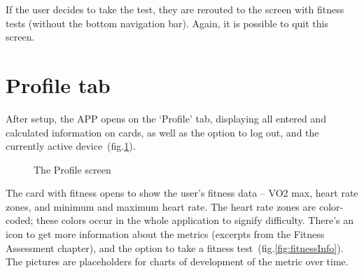 If the user decides to take the test, they are rerouted to the screen with fitness tests (without the bottom navigation bar).
Again, it is possible to quit this screen.

\section{Profile tab}
After setup, the APP opens on the `Profile' tab, displaying all entered and calculated information on cards, as well as the option to log out, and the currently active device~(fig.\ref{fig:profile1}).

\begin{figure}[h!]
    \centering
    \hfill
    \caption{The Profile screen}
    \label{fig:profile1}
\end{figure}

The card with fitness opens to show the user's fitness data -- VO2 max, heart rate zones, and minimum and maximum heart rate.
The heart rate zones are color-coded; these colors occur in the whole application to signify difficulty.
There's an icon to get more information about the metrics (excerpts from the Fitness Assessment chapter), and the option to take a fitness test~(fig.\ref{fig:fitnessInfo}).
The pictures are placeholders for charts of development of the metric over time.

